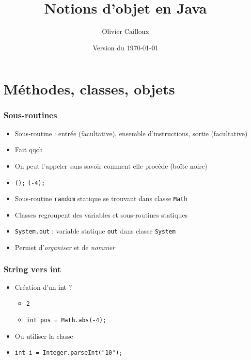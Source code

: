 \documentclass[english, french]{beamer}
\title{Notions d’objet en Java}
\subtitle{}
\author{Olivier Cailloux}
\institute[LAMSADE]{LAMSADE, Université Paris-Dauphine}
\date{Version du \today}
\begin{document}


\begin{frame}[plain]
   \titlepage
\end{frame}
\addtocounter{framenumber}{-1}

\section{Méthodes, classes, objets}
\begin{frame}
	\frametitle{Sous-routines}
	\begin{itemize}
		\item Sous-routine : entrée (facultative), ensemble d’instructions, sortie (facultative)
		\item Fait qqch
		\item On peut l’appeler sans savoir comment elle procède (boîte noire)
		\item {}\texttt{();} \texttt{(-4);}
		\item Sous-routine \texttt{random} statique se trouvant dans classe \texttt{Math}
		\item Classes regroupent des variables et sous-routines statiques
		\item \texttt{System.out} : variable statique \texttt{out} dans classe \texttt{System}
		\item Permet d’\emph{organiser} et de \emph{nommer}
	\end{itemize}
\end{frame}

\begin{frame}
	\frametitle{String vers int}
	\begin{itemize}
		\item Création d’un int ? \pause
		\begin{itemize}
			\item \texttt{2}
			\item \texttt{int pos = Math.abs(-4);} \pause
		\end{itemize}
		\item Ou utiliser la classe 
		\item \texttt{int i = Integer.parseInt("10");}
	\end{itemize}
\end{frame}
\end{document}
